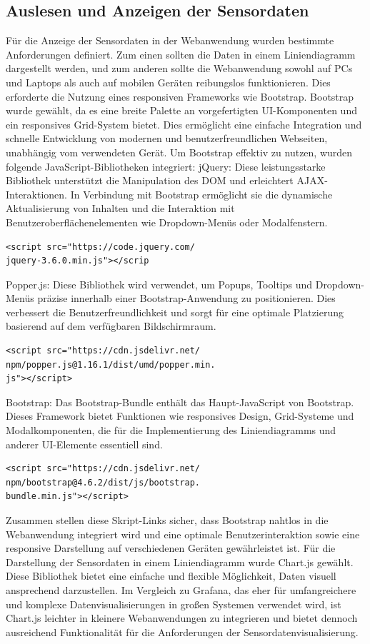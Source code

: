 \documentclass[conference]{IEEEtran}
\begin{document}
\subsection{Auslesen und Anzeigen der Sensordaten}
Für die Anzeige der Sensordaten in der Webanwendung wurden bestimmte Anforderungen definiert. Zum einen sollten die Daten in einem Liniendiagramm dargestellt werden, und zum anderen sollte die Webanwendung sowohl auf PCs und Laptops als auch auf mobilen Geräten reibungslos funktionieren. Dies erforderte die Nutzung eines responsiven Frameworks wie Bootstrap.
Bootstrap wurde gewählt, da es eine breite Palette an vorgefertigten UI-Komponenten und ein responsives Grid-System bietet. Dies ermöglicht eine einfache Integration und schnelle Entwicklung von modernen und benutzerfreundlichen Webseiten, unabhängig vom verwendeten Gerät.
Um Bootstrap effektiv zu nutzen, wurden folgende JavaScript-Bibliotheken integriert:
jQuery: Diese leistungsstarke Bibliothek unterstützt die Manipulation des DOM und erleichtert AJAX-Interaktionen. In Verbindung mit Bootstrap ermöglicht sie die dynamische Aktualisierung von Inhalten und die Interaktion mit Benutzeroberflächenelementen wie Dropdown-Menüs oder Modalfenstern.
\begin{verbatim}
<script src="https://code.jquery.com/
jquery-3.6.0.min.js"></scrip
\end{verbatim}
Popper.js: Diese Bibliothek wird verwendet, um Popups, Tooltips und Dropdown-Menüs präzise innerhalb einer Bootstrap-Anwendung zu positionieren. Dies verbessert die Benutzerfreundlichkeit und sorgt für eine optimale Platzierung basierend auf dem verfügbaren Bildschirmraum.
\begin{verbatim}
<script src="https://cdn.jsdelivr.net/
npm/popper.js@1.16.1/dist/umd/popper.min.
js"></script>
\end{verbatim}
Bootstrap: Das Bootstrap-Bundle enthält das Haupt-JavaScript von Bootstrap. Dieses Framework bietet Funktionen wie responsives Design, Grid-Systeme und Modalkomponenten, die für die Implementierung des Liniendiagramms und anderer UI-Elemente essentiell sind.
\begin{verbatim}
<script src="https://cdn.jsdelivr.net/
npm/bootstrap@4.6.2/dist/js/bootstrap.
bundle.min.js"></script>
\end{verbatim}
Zusammen stellen diese Skript-Links sicher, dass Bootstrap nahtlos in die Webanwendung integriert wird und eine optimale Benutzerinteraktion sowie eine responsive Darstellung auf verschiedenen Geräten gewährleistet ist.
Für die Darstellung der Sensordaten in einem Liniendiagramm wurde Chart.js gewählt. Diese Bibliothek bietet eine einfache und flexible Möglichkeit, Daten visuell ansprechend darzustellen. Im Vergleich zu Grafana, das eher für umfangreichere und komplexe Datenvisualisierungen in großen Systemen verwendet wird, ist Chart.js leichter in kleinere Webanwendungen zu integrieren und bietet dennoch ausreichend Funktionalität für die Anforderungen der Sensordatenvisualisierung.
\end{document}
